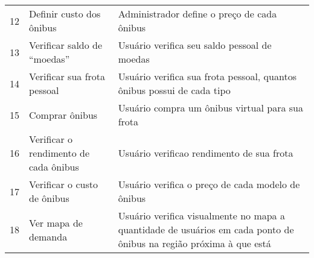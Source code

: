 \begin{table}[H]
\begin{tabular}{lll}
			12 & Definir custo dos ônibus                                   & \begin{minipage}{0.5\textwidth}\espacoVert Administrador define o preço de cada ônibus\end{minipage} \\
			13 & Verificar saldo de “moedas”                                & \begin{minipage}{0.5\textwidth}\espacoVert Usuário verifica seu saldo pessoal de moedas \espacoVert \end{minipage} \\
			14 & Verificar sua frota pessoal                                & \begin{minipage}{0.5\textwidth}\espacoVert Usuário verifica sua frota pessoal, quantos ônibus possui de cada tipo \espacoVert \end{minipage} \\
			15 & Comprar ônibus                                             & Usuário compra um ônibus virtual para sua frota \\
			16 & \begin{minipage}{0.3\textwidth}\espacoVert Verificar o rendimento de cada ônibus \espacoVert \end{minipage}                     & \begin{minipage}{0.5\textwidth}\espacoVert Usuário verificao rendimento de sua frota \espacoVert \end{minipage} \\
			17 & \begin{minipage}{0.3\textwidth}\espacoVert Verificar o custo de ônibus \espacoVert \end{minipage}                  & \begin{minipage}{0.5\textwidth}\espacoVert Usuário verifica o preço de cada modelo de ônibus \espacoVert \end{minipage} \\
			18 & \begin{minipage}{0.3\textwidth}\espacoVert Ver mapa de demanda \espacoVert \end{minipage}                  & \begin{minipage}{0.5\textwidth}\espacoVert Usuário verifica visualmente no mapa a quantidade de usuários em cada ponto de ônibus na região próxima à que está \espacoVert \end{minipage} \\
	    \bottomrule
    \end{tabular}
\end{table}
                                                                

